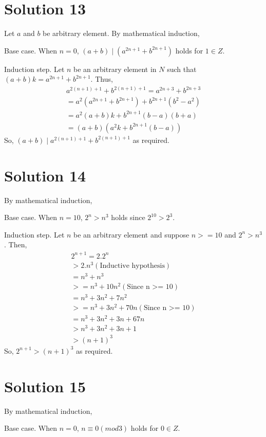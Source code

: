 \documentclass{article}
\begin{document}
\section{Solution 13}
Let $a$ and $b$ be arbitrary element. By mathematical induction,

Base case. When $n=0$, $(a+b) \mid (a^{2n+1} + b^{2n + 1})$ holds for
$1 \in Z$.

Induction step. Let $n$ be an arbitrary element in $N$ such that
$(a+b)k = a^{2n+1} + b^{2n+1}$. Thus,
\begin{align*}
  a^{2(n+1) + 1} + b^{2(n+1) + 1} = a^{2n + 3} + b^{2n + 3} \\
  = a^2(a^{2n + 1}+ b^{2n+1}) + b^{2n+1}(b^2 - a^2) \\
  = a^2(a+b)k + b^{2n+1}(b-a)(b+a) \\
  = (a+b)(a^2k + b^{2n+1}(b-a))
\end{align*}
So, $(a+b) \mid a^{2(n+1) + 1} + b^{2(n+1) + 1}$ as required.

\section{Solution 14}
By mathematical induction,

Base case. When $n = 10$, $2^n > n^3$ holds since $2^{10} > 2^3$.

Induction step. Let $n$ be an arbitrary element and suppose $n >= 10$
and $2^n > n^3$. Then,
\begin{align*}
  2^{n+1} = 2.2^n \\
  > 2.n^3 (\text{Inductive hypothesis}) \\
  = n^3 + n^3 \\
  >= n^3 + 10n^2 (\text{Since n >= 10}) \\
  = n^3 + 3n^2 + 7n^2 \\
  >= n^3 + 3n^2 + 70n (\text{Since n >= 10}) \\
  = n^3 + 3n^2 + 3n + 67n \\
  > n^3 + 3n^2 + 3n + 1 \\
  > (n+1)^3
\end{align*}
So, $2^{n+1} > (n+1)^3$ as required.

\section{Solution 15}
By mathematical induction,

Base case. When $n=0$, $n \equiv 0 (mod 3)$ holds for $0 \in Z$.
\end{document}
